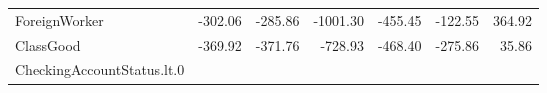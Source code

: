 \documentclass[]{article}
\begin{document}
\begin{longtable}[]{@{}lrrrrrr@{}}
\begin{minipage}[t]{0.31\columnwidth}\raggedright\strut
ForeignWorker\strut
\end{minipage} & \begin{minipage}[t]{0.10\columnwidth}\raggedleft\strut
-302.06\strut
\end{minipage} & \begin{minipage}[t]{0.08\columnwidth}\raggedleft\strut
-285.86\strut
\end{minipage} & \begin{minipage}[t]{0.08\columnwidth}\raggedleft\strut
-1001.30\strut
\end{minipage} & \begin{minipage}[t]{0.08\columnwidth}\raggedleft\strut
-455.45\strut
\end{minipage} & \begin{minipage}[t]{0.08\columnwidth}\raggedleft\strut
-122.55\strut
\end{minipage} & \begin{minipage}[t]{0.08\columnwidth}\raggedleft\strut
364.92\strut
\end{minipage}\tabularnewline
\begin{minipage}[t]{0.31\columnwidth}\raggedright\strut
ClassGood\strut
\end{minipage} & \begin{minipage}[t]{0.10\columnwidth}\raggedleft\strut
-369.92\strut
\end{minipage} & \begin{minipage}[t]{0.08\columnwidth}\raggedleft\strut
-371.76\strut
\end{minipage} & \begin{minipage}[t]{0.08\columnwidth}\raggedleft\strut
-728.93\strut
\end{minipage} & \begin{minipage}[t]{0.08\columnwidth}\raggedleft\strut
-468.40\strut
\end{minipage} & \begin{minipage}[t]{0.08\columnwidth}\raggedleft\strut
-275.86\strut
\end{minipage} & \begin{minipage}[t]{0.08\columnwidth}\raggedleft\strut
35.86\strut
\end{minipage}\tabularnewline
\begin{minipage}[t]{0.31\columnwidth}\raggedright\strut
CheckingAccountStatus.lt.0\strut
\end{minipage} & \begin{minipage}[t]{0.10\columnwidth}\raggedleft\strut

\end{minipage}
\end{longtable}
\end{document}
